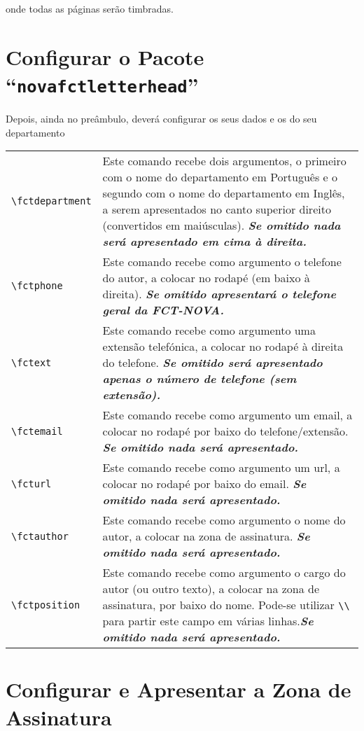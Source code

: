 \documentclass[a4paper,11pt]{article}
\newcommand*{\thePackage}{“\texttt{novafctletterhead}”}
\begin{document}
\noindent onde todas as páginas serão timbradas.

\section{Configurar o Pacote \thePackage}

Depois, ainda no preâmbulo, deverá configurar os seus dados e os do seu departamento

\bgroup
  \renewcommand{\arraystretch}{1.5}
  \begin{xltabular}{\textwidth}{lX}
    \verb+\fctdepartment+ & Este comando recebe dois argumentos, o primeiro com o nome do departamento em Português e o segundo com o nome do departamento em Inglês, a serem apresentados no canto superior direito (convertidos em maiúsculas).  \textbf{\textsl{Se omitido nada será apresentado em cima à direita.}}\\
    \verb+\fctphone+   & Este comando recebe como argumento o telefone do autor, a colocar no rodapé (em baixo à direita). \textbf{\textsl{Se omitido apresentará o telefone geral da FCT-NOVA.}}\\
    \verb+\fctext+   & Este comando recebe como argumento uma extensão telefónica, a colocar no rodapé à direita do telefone. \textbf{\textsl{Se omitido será apresentado apenas o número de telefone (sem extensão).}}\\
    \verb+\fctemail+  & Este comando recebe como argumento um email, a colocar no rodapé por baixo do telefone/extensão. \textbf{\textsl{Se omitido nada será apresentado.}}\\
    \verb+\fcturl+   & Este comando recebe como argumento um url, a colocar no rodapé por baixo do email. \textbf{\textsl{Se omitido nada será apresentado.}}\\
    \verb+\fctauthor+     & Este comando recebe como argumento o nome do autor, a colocar na zona de assinatura.  \textbf{\textsl{Se omitido nada será apresentado.}}\\
    \verb+\fctposition+   & Este comando recebe como argumento o cargo do autor (ou outro texto), a colocar na zona de assinatura, por baixo do nome.  Pode-se utilizar \verb+\\+ para partir este campo em várias linhas.\textbf{\textsl{Se omitido nada será apresentado.}}\\
  \end{xltabular}
\egroup

\section{Configurar e Apresentar a Zona de Assinatura}
\end{document}
